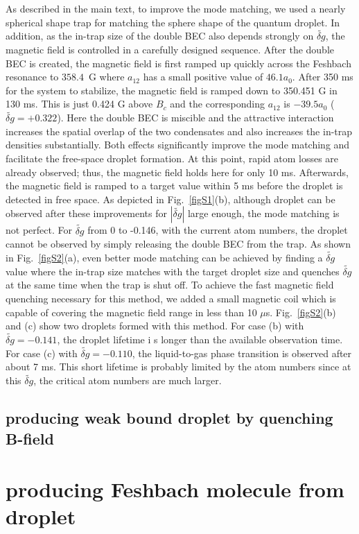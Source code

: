 As described in the main text, to improve the mode matching, we used a nearly spherical shape trap for matching the sphere shape of the quantum droplet.
In addition, as the in-trap size of the double BEC also depends strongly on $\widetilde{\delta g}$, the magnetic field is controlled in a carefully designed sequence. After the double BEC is created, the magnetic field is first ramped up quickly across the Feshbach resonance to $358.4$~G where $a_{12}$ has a small positive value of $46.1a_0$.
After 350 ms for the system to stabilize, the magnetic field is ramped down to 350.451 G in 130 ms.
This is just 0.424 G above $B_c$ and the corresponding $a_{12}$ is $-39.5a_0$ ($\widetilde{\delta g} = +0.322$).
Here the double BEC is miscible and the attractive interaction increases the spatial overlap of the two condensates and also increases the in-trap 
densities substantially. Both effects significantly improve the mode matching and facilitate the free-space droplet formation.
At this point, rapid atom losses are already observed; thus, the magnetic 
field holds here for only 10 ms.
Afterwards, the magnetic field is ramped to a target value within 5 ms before the droplet is detected in free space.
As depicted in Fig.~\ref{figS1}(b), although droplet can be observed after these improvements for $|\widetilde{\delta g}|$ large enough, the mode matching is not perfect. For $\widetilde{\delta g}$ from 0 to -0.146, with the current atom numbers, the droplet cannot be observed by simply releasing the double BEC from the trap. As shown in Fig.~\ref{figS2}(a), even 
better mode matching can be achieved by finding a $\widetilde{\delta g}$ value where the in-trap size matches with the target droplet size and quenches $\widetilde{\delta g}$ at the same time when the trap is shut off. To achieve the fast magnetic field quenching necessary for this method, we added a small magnetic coil which is capable of covering the magnetic field range in less than 10 $\mu$s. Fig.~\ref{figS2}(b) and (c) show two droplets formed with this method. For case (b) with $\widetilde{\delta g} = -0.141$, the droplet lifetime i
s longer than the available observation time. For case (c) with $\widetilde{\delta g} = -0.110$, the liquid-to-gas phase transition is observed after about 7 ms. This short lifetime is probably limited by the atom numbers since at this $\widetilde{\delta g}$, the critical atom numbers are much larger.




\subsection{producing weak bound droplet by quenching B-field}


\section{producing Feshbach molecule from droplet}